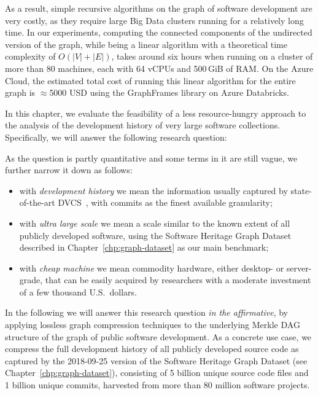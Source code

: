 As a result, simple recursive algorithms on the graph of software development
are very costly, as they require large Big Data clusters running for a
relatively long time. In our experiments, computing the connected components of
the undirected version of the graph, while being a linear algorithm with a
theoretical time complexity of $O(|V| + |E|)$, takes around six hours when
running on a cluster of more than 80 machines, each with 64 vCPUs and 500\,GiB
of RAM\@. On the Azure Cloud, the estimated total cost of running this linear
algorithm for the entire graph is $\approx$5000 USD using the GraphFrames
library on Azure Databricks.

In this chapter, we evaluate the feasibility of a less resource-hungry approach
to the analysis of the development history of very large software collections.
Specifically, we will answer the following research question:

\vspace{1em}

\noindent{}

\vspace{1em}

As the question is partly quantitative and some terms in it are still vague, we
further narrow it down as follows:
\begin{itemize}

\item with \emph{development history} we mean the information usually captured
  by state-of-the-art DVCS~\cite{spinellis2005vcs}, with commits as the finest
  available granularity;

\item with \emph{ultra large scale} we mean a scale similar to the known extent
  of all publicly developed software, using the Software Heritage Graph Dataset
  described in Chapter~\ref{chp:graph-dataset} as our main benchmark;

\item with \emph{cheap machine} we mean commodity hardware, either desktop- or
  server-grade, that can be easily acquired by researchers with a moderate
  investment of a few thousand U.S.~dollars.

\end{itemize}

In the following we will answer this research question \emph{in the
  affirmative}, by applying lossless graph compression techniques to the
underlying Merkle DAG structure of the graph of public software development. As
a concrete use case, we compress the full development history of all publicly
developed source code as captured by the 2018-09-25 version of the Software
Heritage Graph Dataset (see Chapter~\ref{chp:graph-dataset}), consisting of 5
billion unique source code files and 1 billion unique commits, harvested from
more than 80 million software projects.

